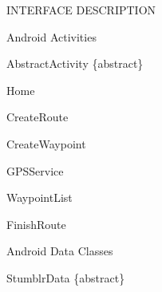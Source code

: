 \documentclass{article}
\begin{document}
\clearpage
\begin{section}{INTERFACE DESCRIPTION}
	\begin{subsection}{Android Activities}
		\begin{subsubsection}{AbstractActivity \{abstract\}}
			
		\end{subsubsection}

		\clearpage
		\begin{subsubsection}{Home}
			
		\end{subsubsection}

		\clearpage
		\begin{subsubsection}{CreateRoute}
			
		\end{subsubsection}

		\clearpage
		\begin{subsubsection}{CreateWaypoint}
			
		\end{subsubsection}
		
		\clearpage
		\begin{subsubsection}{GPSService}
			
		\end{subsubsection}

		\clearpage
		\begin{subsubsection}{WaypointList}
			
		\end{subsubsection}

		\clearpage
		\begin{subsubsection}{FinishRoute}
			
		\end{subsubsection}
	\end{subsection}

	\clearpage
	\begin{subsection}{Android Data Classes}
		\begin{subsubsection}{StumblrData \{abstract\}}
			
		\end{subsubsection}
		

\end{subsection}
\end{section}
\end{document}
